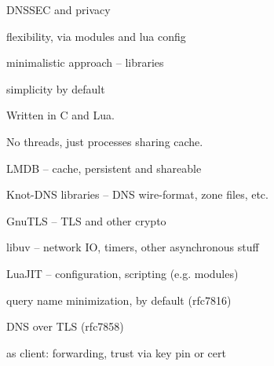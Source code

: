 \bulletList

\item DNSSEC and privacy

\item flexibility, via modules and lua config

\item minimalistic approach -- libraries

\item simplicity by default
\endBulletList


\slide[Architecture]
Written in C and Lua. \par
No threads, just processes sharing cache.

\bulletList
\item LMDB -- cache, persistent and shareable
\item Knot-DNS libraries -- DNS wire-format, zone files, etc.
\item GnuTLS -- TLS and other crypto
\item libuv -- network IO, timers, other asynchronous stuff
\item LuaJIT -- configuration, scripting (e.g. modules)
\endBulletList



\bulletList

\item query name minimization, by default (rfc7816)

\item DNS over TLS (rfc7858)
	\dashList
	\item as client: forwarding, trust via key pin or cert

